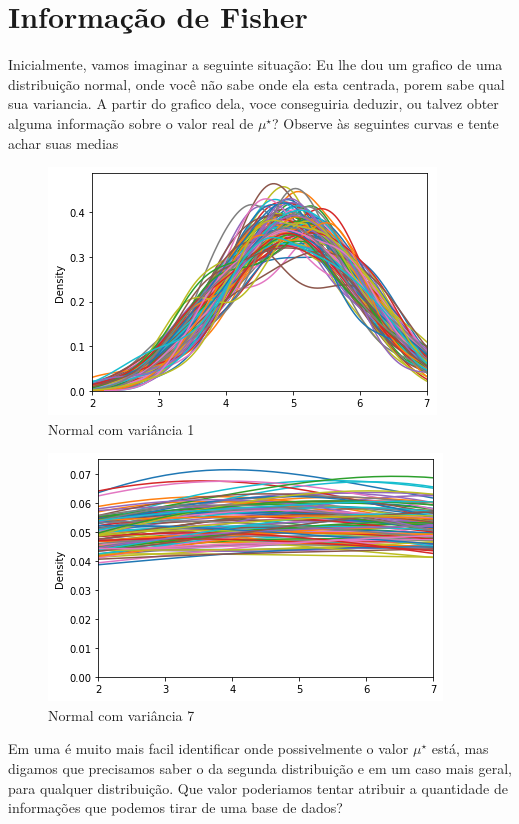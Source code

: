 \documentclass{report}[12pt]
\begin{document}
\section{Informação de Fisher}
Inicialmente, vamos imaginar a seguinte situação: Eu lhe dou um grafico de uma distribuição normal,
onde você não sabe onde ela esta centrada, porem sabe qual sua variancia. A partir do grafico dela,
voce conseguiria deduzir, ou talvez obter alguma informação sobre o valor real de $\mu ^{\star}$?
Observe às seguintes curvas e tente achar suas medias
\begin{figure}[ht]
    \centering    
        \includegraphics[scale=0.4]{normal 51.png}
        \caption{Normal com variância 1}
        \label{fig:Normal 51}
\end{figure}
\begin{figure}[ht]
    \centering    
        \includegraphics[scale=0.4]{normal 57.png}
        \caption{Normal com variância 7}
        \label{fig:Normal 57}
\end{figure}
Em uma é muito mais facil identificar onde possivelmente o valor \(\mu ^{\star}\) está, mas digamos
que precisamos saber o da segunda distribuição e em um caso mais geral, para qualquer distribuição.
Que valor poderiamos tentar atribuir a quantidade de informações que podemos tirar de uma base de dados?
\end{document}
